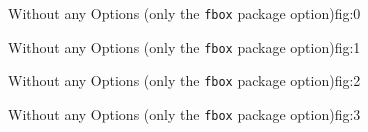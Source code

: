 \documentclass[a4paper,12pt]{article}
\begin{document}
    {Without any Options (only the \texttt{fbox} package option)}{fig:0}

    {Without any Options (only the \texttt{fbox} package option)}{fig:1}

    {Without any Options (only the \texttt{fbox} package option)}{fig:2}

    {Without any Options (only the \texttt{fbox} package option)}{fig:3}
\end{document}

